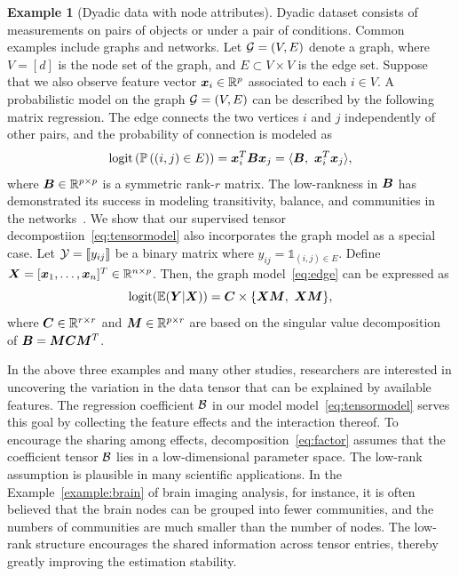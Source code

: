 \documentclass[12pt]{article}
\theoremstyle{plain}
\theoremstyle{definition}
\newtheorem{example}{Example}
\begin{document}
 \begin{example}[Dyadic data with node attributes] Dyadic dataset consists of measurements on pairs of objects or under a pair of conditions. Common examples include graphs and networks. Let $\mathcal{G}=(V,E)$ denote a graph, where $V=[d]$ is the node set of the graph, and $E\subset V\times V$ is the edge set. Suppose that we also observe feature vector $\bm x_i\in\mathbb{R}^p$ associated to each $i\in V$. A probabilistic model on the graph $\mathcal{G}=(V,E)$ can be described by the following matrix regression. The edge connects the two vertices $i$ and $j$ independently of other pairs, and the probability of connection is modeled as
\begin{equation}\label{eq:edge}
 \text{logit}\left(\mathbb{P}\left((i,j)\in E\right)\right)=\mx^T_i\mB\mx_j=\langle \mB,\ \mx^T_i\mx_j\rangle,
 \end{equation}
 where $\bm B\in\mathbb{R}^{p\times p}$ is a symmetric rank-$r$ matrix. The low-rankness in $\bm B$ has demonstrated its success in modeling transitivity, balance, and communities in the networks~\citep{hoff2005bilinear}. We show that our supervised tensor decompostiion~\eqref{eq:tensormodel} also incorporates the graph model as a special case. Let $\mathcal{Y}=\llbracket y_{ij} \rrbracket$ be a binary matrix where $y_{ij}=\mathds{1}_{(i,j)\in E}$. Define $\bm X=[\bm x_1,\ldots,\bm x_n]^T\in\mathbb{R}^{n\times p}$. Then, the graph model~\eqref{eq:edge} can be expressed as
 \[
 \text{logit}(\mathbb{E}(\mY|\mX))=\mC\times\{\mX\mM,\ \mX\mM\}, 
  \]
  where $\bm C\in\mathbb{R}^{r\times r}$ and $\bm M\in\mathbb{R}^{p\times r}$ are based on the singular value decomposition of $\bm B=\bm M\bm C\bm M^T$. 
  \end{example}


In the above three examples and many other studies, researchers are interested in uncovering the variation in the data tensor that can be explained by available features. The regression coefficient $\mathcal{B}$ in our model model~\eqref{eq:tensormodel} serves this goal by collecting the feature effects and the interaction thereof.  
To encourage the sharing among effects, decomposition~\eqref{eq:factor} assumes that the coefficient tensor $\mathcal{B}$ lies in a low-dimensional parameter space.
The low-rank assumption is plausible in many scientific applications. In the Example~\ref{example:brain} of brain imaging analysis, for instance, it is often believed that the brain nodes can be grouped into fewer communities, and the numbers of communities are much smaller than the number of nodes. {\color{red}The low-rank structure encourages the shared information across tensor entries, thereby greatly improving the estimation stability. }
\end{document}
